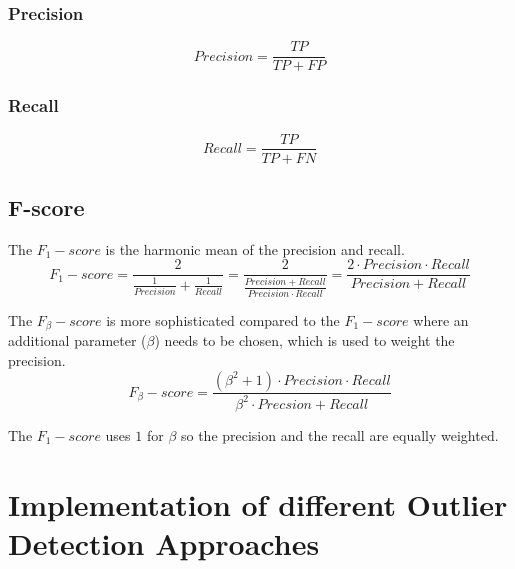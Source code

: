 \subsubsection{Precision}
\begin{equation}
    Precision = \frac{TP}{TP + FP}
\end{equation}

\subsubsection{Recall}
\begin{equation}
    Recall = \frac{TP}{TP + FN}
\end{equation}

\subsection{F-score}
\label{subsection:f-score}
The $F_1-score$ is the harmonic mean of the precision and recall.
\begin{equation}
    F_1-score = \frac{2}{\frac{1}{Precision} + \frac{1}{Recall}} = \frac{2}{\frac{Precision + Recall}{Precision \cdot Recall}} = \frac{2 \cdot Precision \cdot Recall}{Precision + Recall}
\end{equation}
\cite{sasakiTruthFmeasure, chinchorMUC4EvaluationMetrics1992}

The $F_\beta-score$ is more sophisticated compared to the $F_1-score$ where an additional parameter ($\beta$) needs to be chosen, which is used to weight the precision.
\begin{equation}
    F_\beta-score = \frac{(\beta^2 + 1) \cdot Precision \cdot Recall}{\beta^2 \cdot Precsion + Recall}
\end{equation}
\cite{tahaMetricsEvaluating3D2015, chinchorMUC4EvaluationMetrics1992}


The $F_1-score$ uses $1$ for $\beta$ so the precision and the recall are equally weighted.



\section{Implementation of different Outlier Detection Approaches}


